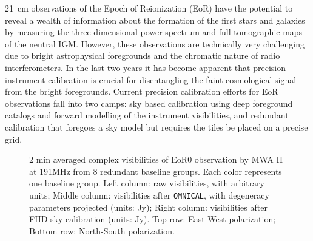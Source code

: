 \documentclass[a0,landscape]{a0poster}
\begin{document}
\begin{multicols}{4}

21~cm observations of the Epoch of Reionization (EoR) have the potential to reveal a wealth of information about the formation of the first stars and galaxies by measuring the three dimensional power spectrum and full tomographic maps of the neutral IGM. However, these observations are technically very challenging due to bright astrophysical foregrounds and the chromatic nature of radio interferometers. In the last two years it has become apparent that precision instrument calibration is crucial for disentangling the faint cosmological signal from the bright foregrounds. Current precision calibration efforts for EoR observations fall into two camps:  sky based calibration using deep foreground catalogs and forward modelling of the instrument visibilities, and redundant calibration that foregoes a sky model but requires the tiles be placed on a precise grid.
\begin{figure}[H]
\centering
\label{comparison_between_FHD_and_OMNICAL}
\caption{2 min averaged complex visibilities of EoR0 observation by MWA II at 191MHz from 8 redundant baseline groups. Each color represents one baseline group. Left column: raw visibilities, with arbitrary units; Middle column: visibilities after \texttt{OMNICAL}, with degeneracy parameters projected (units: Jy); Right column: visibilities after FHD sky calibration (units: Jy). Top row: East-West polarization; Bottom row: North-South polarization.}
\end{figure}



\end{multicols}
\end{document}

